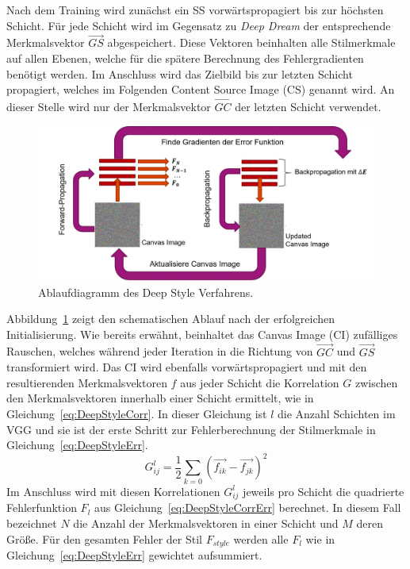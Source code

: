 \documentclass[times, 11pt,twocolumn]{article}
\begin{document}
Nach dem Training wird zunächst ein SS vorwärtspropagiert bis zur höchsten Schicht. Für jede Schicht wird im Gegensatz zu \textit{Deep Dream} der entsprechende Merkmalsvektor $\vec{GS}$ abgespeichert. Diese Vektoren beinhalten alle Stilmerkmale auf allen Ebenen, welche für die spätere Berechnung des Fehlergradienten benötigt werden. Im Anschluss wird das Zielbild bis zur letzten Schicht propagiert, welches im Folgenden Content Source Image (CS) genannt wird. An dieser Stelle wird nur der Merkmalsvektor $\vec{GC}$ der letzten Schicht verwendet.\\

\begin{figure}
	\flushleft
	\includegraphics[width=\columnwidth]{Bilder/DeepStyle.jpg}
	\caption{Ablaufdiagramm des Deep Style Verfahrens.}
	\label{fig:DeepStyle}
\end{figure}
Abbildung~\ref{fig:DeepStyle} zeigt den schematischen Ablauf nach der erfolgreichen Initialisierung. Wie bereits erwähnt, beinhaltet das Canvas Image (CI) zufälliges Rauschen, welches während jeder Iteration in die Richtung von $\vec{GC}$ und $\vec{GS}$ transformiert wird. Das CI wird ebenfalls vorwärtspropagiert und mit den resultierenden Merkmalsvektoren $f$ aus jeder Schicht die Korrelation $G$ zwischen den Merkmalsvektoren innerhalb einer Schicht ermittelt, wie in Gleichung~\ref{eq:DeepStyleCorr}. In dieser Gleichung ist $l$ die Anzahl Schichten im VGG und sie ist der erste Schritt zur Fehlerberechnung der Stilmerkmale in Gleichung~\ref{eq:DeepStyleErr}.
\footnotesize
\begin{equation}
G_{ij}^l= \frac{1}{2}\sum_{k=0} (\vec{f_{ik}}- \vec{f_{jk}})^2
\label{eq:DeepStyleCorr}
\end{equation}
\small
Im Anschluss wird mit diesen Korrelationen $G_{ij}^l$ jeweils  pro Schicht die quadrierte Fehlerfunktion $F_l$ aus Gleichung~\ref{eq:DeepStyleCorrErr} berechnet. In diesem Fall bezeichnet $N$ die Anzahl der Merkmalsvektoren in einer Schicht und $M$ deren Größe. Für den gesamten Fehler der Stil $F_{style}$ werden alle $F_l$ wie in Gleichung~\ref{eq:DeepStyleErr} gewichtet aufsummiert.
\end{document}
